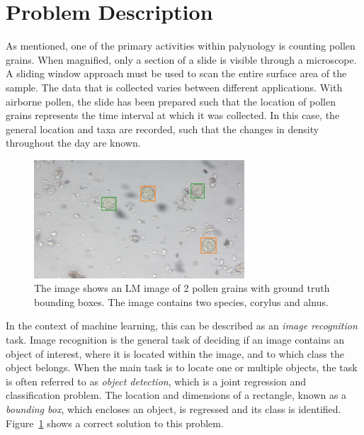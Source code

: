\section{Problem Description}\label{sec:back-problem}
As mentioned, one of the primary activities within palynology is counting pollen grains.
When magnified, only a section of a slide is visible through a microscope.
A sliding window approach must be used to scan the entire surface area of the sample.
The data that is collected varies between different applications.
With airborne pollen, the slide has been prepared such that the location of pollen grains represents the time interval at which it was collected.
In this case, the general location and taxa are recorded, such that the changes in density throughout the day are known.

\begin{figure}[htbp]
  \centering
  \includegraphics[width=0.7\textwidth]{figs/background/GT-Snap-080.png}
  \caption[Bounding boxes]{The image shows an LM image of 2 pollen grains with ground truth bounding boxes.
The image contains two species, \textcolor{corylus}{corylus} and \textcolor{alnus}{alnus}.}\label{fig:bbox}
\end{figure}

In the context of machine learning, this can be described as an \textit{image recognition} task.
Image recognition is the general task of deciding if an image contains an object of interest, where it is located within the image, and to which class the object belongs.
When the main task is to locate one or multiple objects, the task is often referred to as \textit{object detection}, which is a joint regression and classification problem.
The location and dimensions of a rectangle, known as a \textit{bounding box}, which encloses an object, is regressed and its class is identified.
Figure~\ref{fig:bbox} shows a correct solution to this problem.

